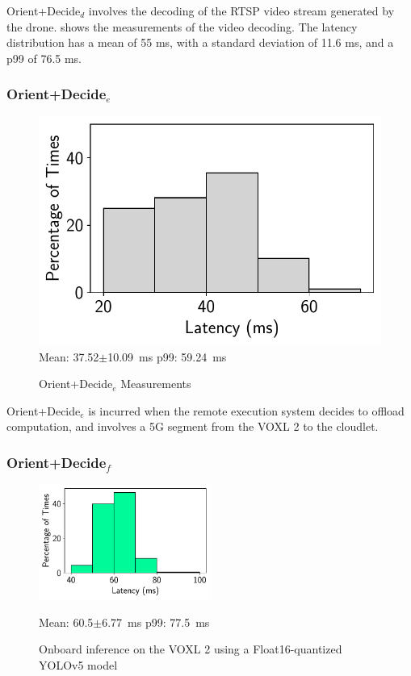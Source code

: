 Orient+Decide$_d$ involves the decoding of the RTSP video stream generated
by the drone.  shows the measurements of
the video decoding. The latency distribution has a mean of 55 ms, with a
standard deviation of 11.6 ms, and a p99 of 76.5 ms.

\subsubsection*{Orient+Decide$_{e}$}

\begin{figure}[htbp]
    \centering
    \includegraphics[width = .4\textwidth]{figs/voxl-5g-latency.pdf}\\
\small{Mean: 37.52$\pm$10.09~ms\; p99: 59.24~ms}\\
\caption{Orient+Decide$_e$ Measurements}
\label{fig:voxl2-5g-latency}
\end{figure}

Orient+Decide$_e$ is incurred when the remote execution system decides to
offload computation, and involves a 5G segment from the VOXL 2 to the cloudlet.

\subsubsection*{Orient+Decide$_{f}$}

\begin{figure}[htbp]
\centerline{\includegraphics[width = 0.5\textwidth]{figs/onboard-inference-hist.pdf}}
\centering
Mean: 60.5$\pm$6.77~ms\; p99: 77.5~ms\\
\caption{Onboard inference on the VOXL 2 using a Float16-quantized YOLOv5 model}
\label{fig:voxl2-inference-hist}
\end{figure}

